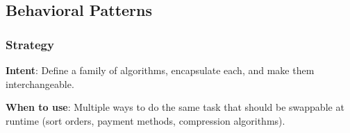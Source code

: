 \documentclass[11pt]{article}
\begin{document}
\subsection{Behavioral Patterns}\label{behavioral-patterns}

\subsubsection{Strategy}\label{strategy}


\textbf{Intent}: Define a family of algorithms, encapsulate each, and make them interchangeable.

\textbf{When to use}: Multiple ways to do the same task that should be swappable at runtime (sort orders, payment methods, compression algorithms).

\end{document}
